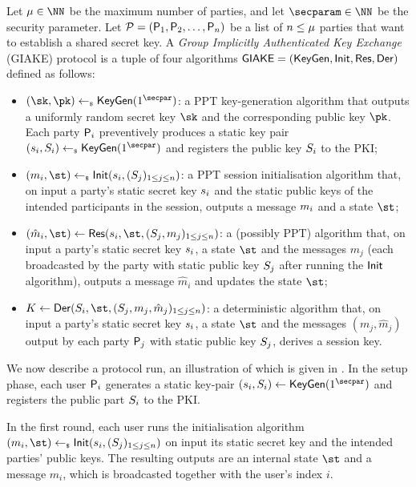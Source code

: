 \begin{plaindef}[GIAKE]\label{def:GKE}
	Let $\projectKey \in \NN$ be the maximum number of parties, and let $\secparam\in \NN$ be the security parameter. 
	Let $\PartySet = (\User[1],\User[2],\dots,\allowbreak \User[n])$ be a list of $n \leq \projectKey$ parties that want to establish a shared secret key.
	A \textit{Group Implicitly Authenticated Key Exchange} (GIAKE) protocol is a tuple of four algorithms $\GIAKE = (\KeyGen, \GAKEIni, \GAKERes, \GAKEDer)$ defined as follows:
	\begin{itemize}
		\item $(\sk,\pk) \getsr \KeyGen(1^\secpar)$: a PPT key-generation algorithm that outputs a uniformly random secret key $\sk$ and the corresponding public key $\pk$.
		Each party $\User[i]$ preventively produces a static key pair $(\ssk_i,\spk_i) \getsr \KeyGen(1^\secpar)$ and registers the public key $\spk_i$ to the PKI;
		\item $(m_i,\st) \getsr \GAKEIni (\ssk_i,(\spk_j)_{1\leq j \leq n})$: a PPT session initialisation algorithm that, on input a party's static secret key $\ssk_i$ and the static public keys of the intended participants in the session, outputs a message $\messageIni$ and a state $\st$;
		\item $(\hat{m}_i,\st) \gets \GAKERes(\ssk_i,\st,(\spk_j,m_j)_{1\leq j \leq n})$: a (possibly PPT) algorithm that, on input a party's static secret key $\ssk_i$, a state $\st$ and the messages $m_j$ (each broadcasted by the party with static public key $\spk_j$ after running the $\GAKEIni$ algorithm), outputs a message $\hat{m}_i$ and updates the state $\st$;
		\item $K \gets \GAKEDer (\spk_i,\st,(\spk_j,m_j,\hat{m}_j)_{1\leq j \leq n})$: a deterministic algorithm that,  on input a party's static secret key $\ssk_i$, a state $\st$ and the messages $(m_j,\hat{m}_j)$ output by each party $\User[j]$ with static public key $\spk_j$, derives a session key.
	\end{itemize}
	
	We now describe a protocol run, an illustration of which is given in .
	In the setup phase, each user $\User[i]$ generates a static key-pair $(\ssk_i,\spk_i) \gets \KeyGen(1^\secpar)$ and registers the public part $\spk_i$ to the PKI.
	
	In the first round, each user runs the initialisation algorithm $(m_i,\st) \getsr \GAKEIni (\ssk_i,(\spk_j)_{1\leq j \leq n})$ on input its static secret key and the intended parties' public keys. 
	The resulting outputs are an internal state $\st$ and a message $m_i$, which is broadcasted together with the user's index $i$.
	

\end{plaindef}
